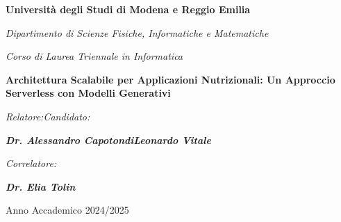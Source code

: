 \thispagestyle{empty}
\vspace*{\fill}
\vspace{1cm}
\begin{center}
	\textbf{\LARGE Universit\`a degli Studi di Modena e Reggio Emilia}\par
\end{center}
\vspace{0.5cm}
\begin{center}
	\emph{\Large  Dipartimento di Scienze Fisiche, Informatiche e Matematiche}\par
\end{center}
\vspace{0.5cm}	
\begin{center}
	\emph{\Large Corso di Laurea Triennale in Informatica}\par
\end{center}	
\vspace{2cm}
\lyxline{\normalsize}
\vspace{1cm}
\begin{center}
	\textbf{\huge Architettura Scalabile per
Applicazioni Nutrizionali: Un
Approccio Serverless con Modelli
Generativi} \vspace{0.25cm} \textbf{\huge}
	\par
\end{center}
\vspace{1cm}
\lyxline{\normalsize}
\vspace{3.5cm}
\noindent\emph{\large Relatore:}\emph{\hfill{}\hfill{}}\emph{\large Candidato:}{\large \par}
\noindent\textbf{\emph{\large Dr. Alessandro Capotondi}}\emph{\hfill{}\hfill{}}\textbf{\emph{\large Leonardo Vitale}}{\large \par}

\vspace{0.6cm}
\noindent\emph{\large Correlatore:}{\large \par}
\noindent\textbf{\emph{\large Dr. Elia Tolin}}{\large \par}

\vspace{3cm}
\begin{center}
	{\large Anno Accademico 2024/2025}\par
\end{center}
\vspace*{\fill}
\pagebreak{}
